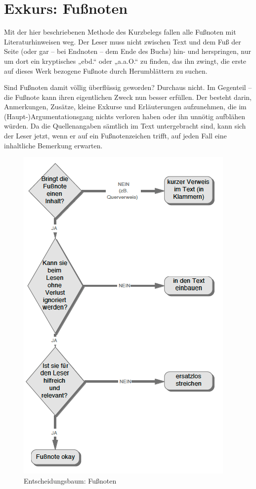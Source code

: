 \documentclass[]{book}
\theoremstyle{definition}
\theoremstyle{definition}
\theoremstyle{definition}
\theoremstyle{remark}
\begin{document}
\section{Exkurs: Fußnoten}\label{exkurs-funoten}

Mit der hier beschriebenen Methode des Kurzbelegs fallen alle Fußnoten
mit Literaturhinweisen weg. Der Leser muss nicht zwischen Text und dem
Fuß der Seite (oder gar -- bei Endnoten -- dem Ende des Buchs) hin- und
herspringen, nur um dort ein kryptisches „ebd.`` oder „a.a.O.`` zu
finden, das ihn zwingt, die erste auf dieses Werk bezogene Fußnote durch
Herumblättern zu suchen.

Sind Fußnoten damit völlig überflüssig geworden? Durchaus nicht. Im
Gegenteil -- die Fußnote kann ihren eigentlichen Zweck nun besser
erfüllen. Der besteht darin, Anmerkungen, Zusätze, kleine Exkurse und
Erläuterungen aufzunehmen, die im (Haupt-)Argumentationsgang nichts
verloren haben oder ihn unnötig aufblähen würden. Da die Quellenangaben
sämtlich im Text untergebracht sind, kann sich der Leser jetzt, wenn er
auf ein Fußnotenzeichen trifft, auf jeden Fall eine inhaltliche
Bemerkung erwarten.

\begin{figure}

{\centering \includegraphics{images/zitieren-fussnote-min} 

}

\caption{Entscheidungsbaum: Fußnoten}\label{fig:unnamed-chunk-24}
\end{figure}
\end{document}
